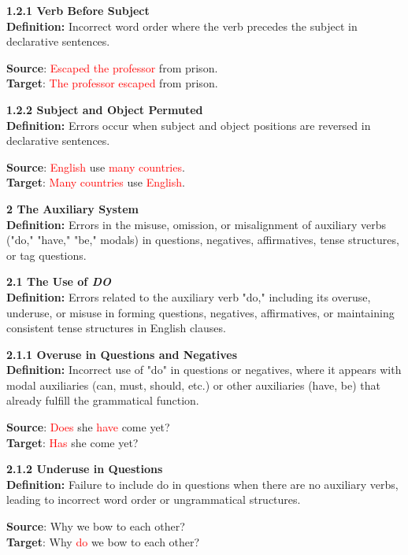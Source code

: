 \begin{tcolorbox}[breakable]
\noindent \textbf{1.2.1 Verb Before Subject}\\
\textbf{Definition:} Incorrect word order where the verb precedes the subject in declarative sentences.


\textbf{Source}: \textcolor{red}{Escaped the professor} from prison. \\
\textbf{Target}: \textcolor{red}{The professor escaped} from prison.


\noindent \textbf{1.2.2 Subject and Object Permuted}\\
\textbf{Definition:} Errors occur when subject and object positions are reversed in declarative sentences.


\textbf{Source}: \textcolor{red}{English} use \textcolor{red}{many countries}. \\
\textbf{Target}: \textcolor{red}{Many countries} use \textcolor{red}{English}.


\noindent \textbf{2 The Auxiliary System}\\
\textbf{Definition:} Errors in the misuse, omission, or misalignment of auxiliary verbs ("do," "have," "be," modals) in questions, negatives, affirmatives, tense structures, or tag questions.

\noindent \textbf{2.1 The Use of \textit{DO}}\\
\textbf{Definition:} Errors related to the auxiliary verb "do," including its overuse, underuse, or misuse in forming questions, negatives, affirmatives, or maintaining consistent tense structures in English clauses.

\noindent \textbf{2.1.1 Overuse in Questions and Negatives}\\
\textbf{Definition:} Incorrect use of "do" in questions or negatives, where it appears with modal auxiliaries (can, must, should, etc.) or other auxiliaries (have, be) that already fulfill the grammatical function.


\textbf{Source}: \textcolor{red}{Does} she \textcolor{red}{have} come yet? \\
\textbf{Target}: \textcolor{red}{Has} she come yet?


\noindent \textbf{2.1.2 Underuse in Questions}\\
\textbf{Definition:} Failure to include do in questions when there are no auxiliary verbs, leading to incorrect word order or ungrammatical structures.


\textbf{Source}: Why we bow to each other? \\
\textbf{Target}: Why \textcolor{red}{do} we bow to each other?



\end{tcolorbox}
